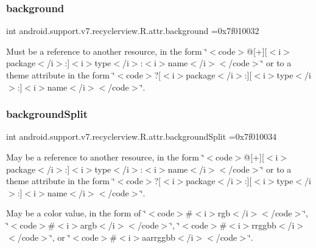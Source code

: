 \subsubsection{\texorpdfstring{background}{background}}
{\footnotesize\ttfamily int android.\+support.\+v7.\+recyclerview.\+R.\+attr.\+background =0x7f010032\hspace{0.3cm}{\ttfamily [static]}}

Must be a reference to another resource, in the form \char`\"{}$<$code$>$@\mbox{[}+\mbox{]}\mbox{[}$<$i$>$package$<$/i$>$\+:\mbox{]}$<$i$>$type$<$/i$>$\+:$<$i$>$name$<$/i$>$$<$/code$>$\char`\"{} or to a theme attribute in the form \char`\"{}$<$code$>$?\mbox{[}$<$i$>$package$<$/i$>$\+:\mbox{]}\mbox{[}$<$i$>$type$<$/i$>$\+:\mbox{]}$<$i$>$name$<$/i$>$$<$/code$>$\char`\"{}. \mbox{\label{classandroid_1_1support_1_1v7_1_1recyclerview_1_1R_1_1attr_a8364867e011d2b59d663637cf8e4ba76}} 
\subsubsection{\texorpdfstring{background\+Split}{backgroundSplit}}
{\footnotesize\ttfamily int android.\+support.\+v7.\+recyclerview.\+R.\+attr.\+background\+Split =0x7f010034\hspace{0.3cm}{\ttfamily [static]}}

May be a reference to another resource, in the form \char`\"{}$<$code$>$@\mbox{[}+\mbox{]}\mbox{[}$<$i$>$package$<$/i$>$\+:\mbox{]}$<$i$>$type$<$/i$>$\+:$<$i$>$name$<$/i$>$$<$/code$>$\char`\"{} or to a theme attribute in the form \char`\"{}$<$code$>$?\mbox{[}$<$i$>$package$<$/i$>$\+:\mbox{]}\mbox{[}$<$i$>$type$<$/i$>$\+:\mbox{]}$<$i$>$name$<$/i$>$$<$/code$>$\char`\"{}. 

May be a color value, in the form of \char`\"{}$<$code$>$\#$<$i$>$rgb$<$/i$>$$<$/code$>$\char`\"{}, \char`\"{}$<$code$>$\#$<$i$>$argb$<$/i$>$$<$/code$>$\char`\"{}, \char`\"{}$<$code$>$\#$<$i$>$rrggbb$<$/i$>$$<$/code$>$\char`\"{}, or \char`\"{}$<$code$>$\#$<$i$>$aarrggbb$<$/i$>$$<$/code$>$\char`\"{}. \mbox{\label{classandroid_1_1support_1_1v7_1_1recyclerview_1_1R_1_1attr_ab5d0e909439a9ea5f7b57e6fa8b7c450}} 
